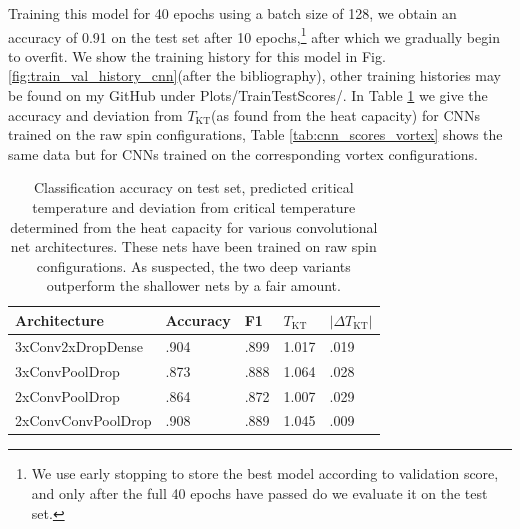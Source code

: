 \documentclass[]{article}
\begin{document}
Training this model for 40 epochs using a batch size of 128, we obtain an accuracy of 0.91 on the test set after 10 epochs,\footnote{We use early stopping to store the best model according to validation score, and only after the full 40 epochs have passed do we evaluate it on the test set.} after which we gradually begin to overfit. We show the training history for this model in Fig. \ref{fig:train_val_history_cnn}(after the bibliography), other training histories may be found on my GitHub under Plots/TrainTestScores/. In Table \ref{tab:cnn_scores} we give the accuracy and deviation from $T_\text{KT}$(as found from the heat capacity) for CNNs trained on the raw spin configurations, Table \ref{tab:cnn_scores_vortex} shows the same data but for CNNs trained on the corresponding vortex configurations.

\begin{table}[H]
	\centering
	\begin{tabular}{l|l|l|l|l}
		Architecture & Accuracy & F1 & $T_\text{KT}$ & $|\Delta T_\text{KT}|$ \\
		\hline 
		3xConv2xDropDense & .904 & .899 & 1.017 &  .019  \\
		3xConvPoolDrop & .873 & .888 & 1.064 &  .028  \\
		2xConvPoolDrop & .864 & .872 & 1.007 &  .029 \\
		2xConvConvPoolDrop & .908 & .889 & 1.045 & .009 \\
	\end{tabular}
	\caption{Classification accuracy on test set, predicted critical temperature and deviation from critical temperature determined from the heat capacity for various convolutional net architectures. These nets have been trained on raw spin configurations. As suspected, the two deep variants outperform the shallower nets by a fair amount.}
	\label{tab:cnn_scores}
\end{table}
\end{document}

